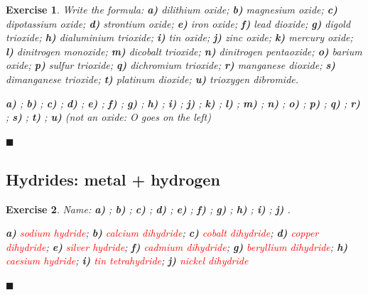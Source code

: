 \documentclass[12pt]{article}
\theoremstyle{mygreennumbox}
\newtheorem{ejercicioT}{Exercise}[section]
\newenvironment{exercise}{\begin{eBoxmygreen}\begin{ejercicioT}}{\hfill{\color{mygreen}\tiny\ensuremath{\blacksquare}}\end{ejercicioT}\end{eBoxmygreen}}
\begin{document}
\begin{exercise}
    Write the formula: \textbf{a)} dilithium oxide; \textbf{b)} magnesium oxide; \textbf{c)} dipotassium oxide; \textbf{d)} strontium oxide; \textbf{e)} iron oxide; \textbf{f)} lead dioxide; \textbf{g)} digold trioxide; \textbf{h)} dialuminium trioxide; \textbf{i)} tin oxide; \textbf{j)} zinc oxide; \textbf{k)} mercury oxide; \textbf{l)} dinitrogen monoxide; \textbf{m)} dicobalt trioxide; \textbf{n)} dinitrogen pentaoxide; \textbf{o)} barium oxide; \textbf{p)} sulfur trioxide; \textbf{q)} dichromium trioxide; \textbf{r)} manganese dioxide; \textbf{s)} dimanganese trioxide; \textbf{t)} platinum dioxide; \textbf{u)} trioxygen dibromide.
    \begin{solu}
        \textbf{a)} \textcolor{red}{}; \textbf{b)} \textcolor{red}{}; \textbf{c)} \textcolor{red}{}; \textbf{d)} \textcolor{red}{}; \textbf{e)} \textcolor{red}{}; \textbf{f)} \textcolor{red}{}; \textbf{g)} \textcolor{red}{}; \textbf{h)} \textcolor{red}{}; \textbf{i)} \textcolor{red}{}; \textbf{j)} \textcolor{red}{}; \textbf{k)} \textcolor{red}{}; \textbf{l)} \textcolor{red}{}; \textbf{m)} \textcolor{red}{}; \textbf{n)} \textcolor{red}{}; \textbf{o)} \textcolor{red}{}; \textbf{p)} \textcolor{red}{}; \textbf{q)} \textcolor{red}{}; \textbf{r)} \textcolor{red}{}; \textbf{s)} \textcolor{red}{}; \textbf{t)} \textcolor{red}{}; \textbf{u)} \textcolor{red}{} (not an oxide: O goes on the left)
    \end{solu}
\end{exercise}

\subsection{Hydrides: metal + hydrogen}

\begin{exercise}
    Name: \textbf{a)} ; \textbf{b)} ; \textbf{c)} ; \textbf{d)} ; \textbf{e)} ; \textbf{f)} ; \textbf{g)} ; \textbf{h)} ; \textbf{i)} ; \textbf{j)} .
    \begin{solu}
        \textbf{a)} \textcolor{red}{sodium hydride}; \textbf{b)} \textcolor{red}{calcium dihydride}; \textbf{c)} \textcolor{red}{cobalt dihydride}; \textbf{d)} \textcolor{red}{copper dihydride}; \textbf{e)} \textcolor{red}{silver hydride}; \textbf{f)} \textcolor{red}{cadmium dihydride}; \textbf{g)} \textcolor{red}{beryllium dihydride}; \textbf{h)} \textcolor{red}{caesium hydride}; \textbf{i)} \textcolor{red}{tin tetrahydride}; \textbf{j)} \textcolor{red}{nickel dihydride}
    \end{solu}
\end{exercise}
\end{document}
